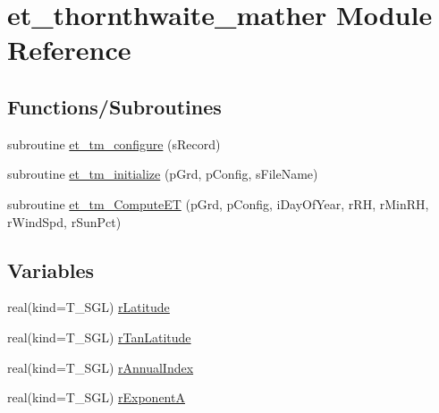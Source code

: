 \hypertarget{namespaceet__thornthwaite__mather}{
\section{et\_\-thornthwaite\_\-mather Module Reference}
\label{namespaceet__thornthwaite__mather}
}
\subsection*{Functions/Subroutines}
\begin{DoxyCompactItemize}
\item 
subroutine \hyperlink{namespaceet__thornthwaite__mather_a84694295e6a4da72980bb30f1adc6a82}{et\_\-tm\_\-configure} (sRecord)
\item 
subroutine \hyperlink{namespaceet__thornthwaite__mather_ad8d9ce7fc2d1f78f064d52577e1ff7a8}{et\_\-tm\_\-initialize} (pGrd, pConfig, sFileName)
\item 
subroutine \hyperlink{namespaceet__thornthwaite__mather_a66d5f8c191c0aa82a1ce55b862972afc}{et\_\-tm\_\-ComputeET} (pGrd, pConfig, iDayOfYear, rRH, rMinRH, rWindSpd, rSunPct)
\end{DoxyCompactItemize}
\subsection*{Variables}
\begin{DoxyCompactItemize}
\item 
real(kind=T\_\-SGL) \hyperlink{namespaceet__thornthwaite__mather_a851c5df67086bf9ccad5d274fe8118c2}{rLatitude}
\item 
real(kind=T\_\-SGL) \hyperlink{namespaceet__thornthwaite__mather_a668487e9bfd1609275ea1ede77d25206}{rTanLatitude}
\item 
real(kind=T\_\-SGL) \hyperlink{namespaceet__thornthwaite__mather_aafcf8b496955f8fa02d8fcf420b60302}{rAnnualIndex}
\item 
real(kind=T\_\-SGL) \hyperlink{namespaceet__thornthwaite__mather_a9dd015bf8736b5aca8e3e0c29b39335a}{rExponentA}
\end{DoxyCompactItemize}


